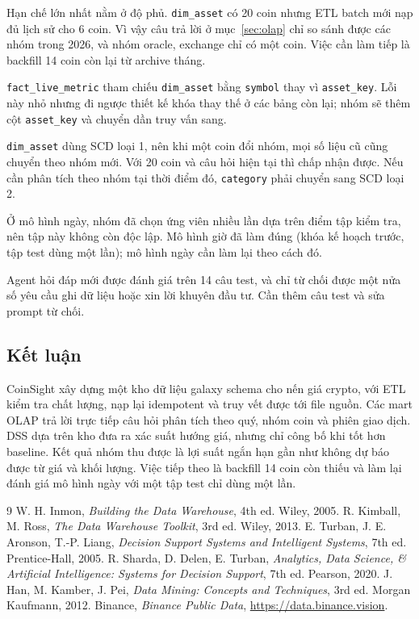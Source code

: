 \documentclass[11pt,a4paper]{article}
\newcommand{\code}[1]{\texttt{#1}}
\begin{document}
Hạn chế lớn nhất nằm ở độ phủ. \code{dim\_asset} có 20 coin nhưng ETL batch mới nạp đủ lịch sử
cho 6 coin. Vì vậy câu trả lời ở mục~\ref{sec:olap} chỉ so sánh được các nhóm trong 2026, và
nhóm oracle, exchange chỉ có một coin. Việc cần làm tiếp là backfill 14 coin còn lại từ archive tháng.

\code{fact\_live\_metric} tham chiếu \code{dim\_asset} bằng \code{symbol} thay vì \code{asset\_key}.
Lỗi này nhỏ nhưng đi ngược thiết kế khóa thay thế ở các bảng còn lại; nhóm sẽ thêm cột
\code{asset\_key} và chuyển dần truy vấn sang.

\code{dim\_asset} dùng SCD loại 1, nên khi một coin đổi nhóm, mọi số liệu cũ cũng chuyển theo
nhóm mới. Với 20 coin và câu hỏi hiện tại thì chấp nhận được. Nếu cần phân tích theo nhóm tại
thời điểm đó, \code{category} phải chuyển sang SCD loại 2.

Ở mô hình ngày, nhóm đã chọn ứng viên nhiều lần dựa trên điểm tập kiểm tra, nên tập này không
còn độc lập. Mô hình giờ đã làm đúng (khóa kế hoạch trước, tập test dùng một lần); mô hình ngày
cần làm lại theo cách đó.

Agent hỏi đáp mới được đánh giá trên 14 câu test, và chỉ từ chối được một nửa số yêu cầu ghi dữ
liệu hoặc xin lời khuyên đầu tư. Cần thêm câu test và sửa prompt từ chối.
\subsection{Kết luận}
CoinSight xây dựng một kho dữ liệu galaxy schema cho nến giá crypto, với ETL kiểm tra chất lượng,
nạp lại idempotent và truy vết được tới file nguồn. Các mart OLAP trả lời trực tiếp câu hỏi phân
tích theo quý, nhóm coin và phiên giao dịch. DSS dựa trên kho đưa ra xác suất hướng giá, nhưng chỉ
công bố khi tốt hơn baseline. Kết quả nhóm thu được là lợi suất ngắn hạn gần như không dự báo
được từ giá và khối lượng. Việc tiếp theo là backfill 14 coin còn thiếu và làm lại đánh giá
mô hình ngày với một tập test chỉ dùng một lần.


\begin{thebibliography}{9}
 W. H. Inmon, \emph{Building the Data Warehouse}, 4th ed. Wiley, 2005.
 R. Kimball, M. Ross, \emph{The Data Warehouse Toolkit}, 3rd ed. Wiley, 2013.
 E. Turban, J. E. Aronson, T.-P. Liang, \emph{Decision Support Systems and Intelligent Systems}, 7th ed. Prentice-Hall, 2005.
 R. Sharda, D. Delen, E. Turban, \emph{Analytics, Data Science, \& Artificial Intelligence: Systems for Decision Support}, 7th ed. Pearson, 2020.
 J. Han, M. Kamber, J. Pei, \emph{Data Mining: Concepts and Techniques}, 3rd ed. Morgan Kaufmann, 2012.
 Binance, \emph{Binance Public Data}, \url{https://data.binance.vision}.
\end{thebibliography}
\end{document}
